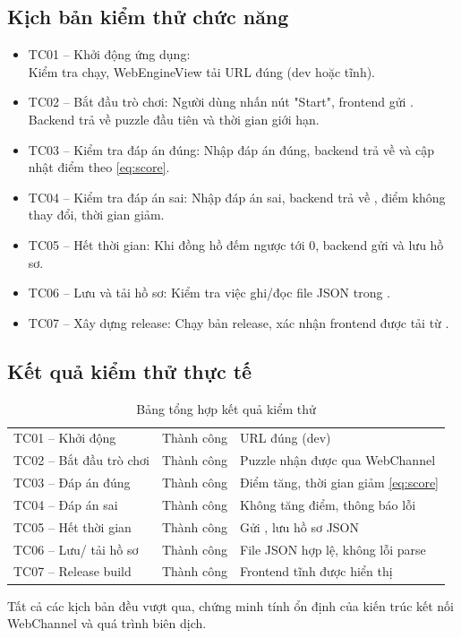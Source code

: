 \subsection{Kịch bản kiểm thử chức năng}
\label{subsec:test_cases}
\begin{itemize}
    \item TC01 – Khởi động ứng dụng:\\
    Kiểm tra  chạy, WebEngineView tải URL đúng (dev hoặc tĩnh).
    \item TC02 – Bắt đầu trò chơi: Người dùng nhấn nút "Start", frontend gửi . Backend trả về puzzle đầu tiên và thời gian giới hạn.
    \item TC03 – Kiểm tra đáp án đúng: Nhập đáp án đúng, backend trả về  và cập nhật điểm theo \eqref{eq:score}.
    \item TC04 – Kiểm tra đáp án sai: Nhập đáp án sai, backend trả về , điểm không thay đổi, thời gian giảm.
    \item TC05 – Hết thời gian: Khi đồng hồ đếm ngược tới 0, backend gửi  và lưu hồ sơ.
    \item TC06 – Lưu và tải hồ sơ: Kiểm tra việc ghi/đọc file JSON trong .
    \item TC07 – Xây dựng release: Chạy bản release, xác nhận frontend được tải từ .
\end{itemize}

\subsection{Kết quả kiểm thử thực tế}
\label{subsec:test_results}
\begin{table}[h!]
\centering
\caption{Bảng tổng hợp kết quả kiểm thử}
\label{tab:test_results}
\begin{tabularx}{\textwidth}{|L{4.5cm}|C{3.0cm}|Y|}
\hline
{} &  &  \\ \hline
TC01 – Khởi động & Thành công & URL đúng (dev) \\ \hline
TC02 – Bắt đầu trò chơi & Thành công & Puzzle nhận được qua WebChannel \\ \hline
TC03 – Đáp án đúng & Thành công & Điểm tăng, thời gian giảm \eqref{eq:score} \\ \hline
TC04 – Đáp án sai & Thành công & Không tăng điểm, thông báo lỗi \\ \hline
TC05 – Hết thời gian & Thành công & Gửi , lưu hồ sơ JSON \\ \hline
TC06 – Lưu/ tải hồ sơ & Thành công & File JSON hợp lệ, không lỗi parse \\ \hline
TC07 – Release build & Thành công & Frontend tĩnh được hiển thị \\ \hline
\end{tabularx}
\end{table}
Tất cả các kịch bản đều vượt qua, chứng minh tính ổn định của kiến trúc kết nối WebChannel và quá trình biên dịch.

